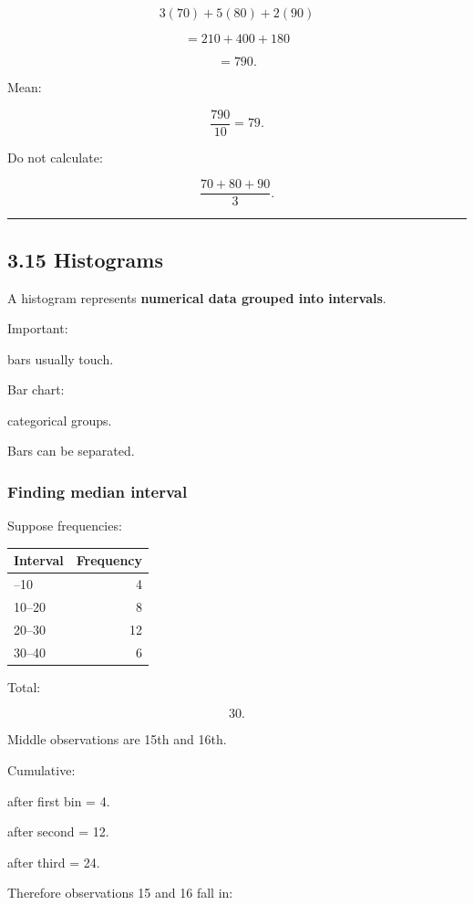 \documentclass[
]{article}
\newcounter{none} %
\begin{document}
\[
3(70)+5(80)+2(90)
\]

\[
=210+400+180
\]

\[
=790.
\]

Mean:

\[
\frac{790}{10}
=
\boxed{79}.
\]

Do not calculate:

\[
\frac{70+80+90}{3}.
\]

\begin{center}\rule{0.5\linewidth}{0.5pt}\end{center}

\subsection{3.15 Histograms}\label{histograms}

A histogram represents \textbf{numerical data grouped into intervals}.

Important:

bars usually touch.

Bar chart:

categorical groups.

Bars can be separated.

\subsubsection{Finding median interval}\label{finding-median-interval}

Suppose frequencies:

{\def\LTcaptype{none} %
\begin{longtable}[]{@{}lr@{}}
\toprule\noalign{}
Interval & Frequency \\
\midrule\noalign{}
\endhead
\bottomrule\noalign{}
\endlastfoot
0--10 & 4 \\
10--20 & 8 \\
20--30 & 12 \\
30--40 & 6 \\
\end{longtable}
}

Total:

\[
30.
\]

Middle observations are 15th and 16th.

Cumulative:

after first bin = 4.

after second = 12.

after third = 24.

Therefore observations 15 and 16 fall in:
\end{document}

